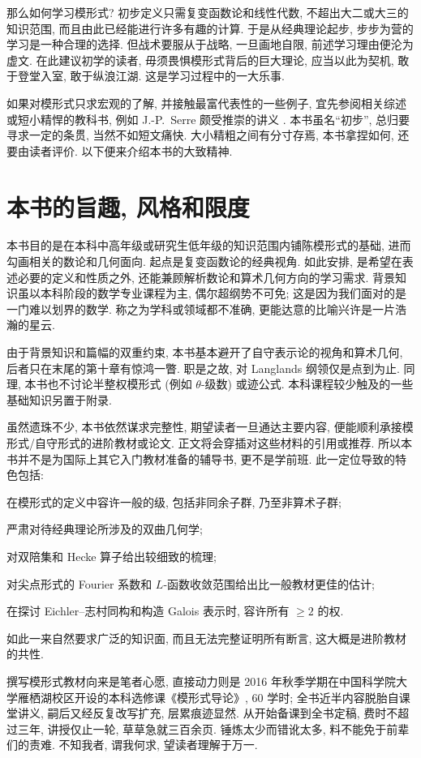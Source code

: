 那么如何学习模形式? 初步定义只需复变函数论和线性代数, 不超出大二或大三的知识范围, 而且由此已经能进行许多有趣的计算. 于是从经典理论起步, 步步为营的学习是一种合理的选择. 但战术要服从于战略, 一旦画地自限, 前述学习理由便沦为虚文. 在此建议初学的读者, 毋须畏惧模形式背后的巨大理论, 应当以此为契机, 敢于登堂入室, 敢于纵浪江湖. 这是学习过程中的一大乐事.

如果对模形式只求宏观的了解, 并接触最富代表性的一些例子, 宜先参阅相关综述或短小精悍的教科书, 例如 J.-P.\ Serre 颇受推崇的讲义 \cite{Se73}. 本书虽名``初步'', 总归要寻求一定的条贯, 当然不如短文痛快. 大小精粗之间有分寸存焉, 本书拿捏如何, 还要由读者评价. 以下便来介绍本书的大致精神.


\section*{本书的旨趣, 风格和限度}
本书目的是在本科中高年级或研究生低年级的知识范围内铺陈模形式的基础, 进而勾画相关的数论和几何面向. 起点是复变函数论的经典视角. 如此安排, 是希望在表述必要的定义和性质之外, 还能兼顾解析数论和算术几何方向的学习需求. 背景知识虽以本科阶段的数学专业课程为主, 偶尔超纲势不可免; 这是因为我们面对的是一门难以划界的数学. 称之为学科或领域都不准确, 更能达意的比喻兴许是一片浩瀚的星云.

由于背景知识和篇幅的双重约束, 本书基本避开了自守表示论的视角和算术几何, 后者只在末尾的第十章有惊鸿一瞥. 职是之故, 对 Langlands 纲领仅是点到为止. 同理, 本书也不讨论半整权模形式 (例如 $\theta$-级数) 或迹公式. 本科课程较少触及的一些基础知识另置于附录.

虽然遗珠不少, 本书依然谋求完整性, 期望读者一旦通达主要内容, 便能顺利承接模形式/自守形式的进阶教材或论文. 正文将会穿插对这些材料的引用或推荐. 所以本书并不是为国际上其它入门教材准备的辅导书, 更不是学前班. 此一定位导致的特色包括:
\begin{compactitem}
	\item 在模形式的定义中容许一般的级, 包括非同余子群, 乃至非算术子群;
	\item 严肃对待经典理论所涉及的双曲几何学;
	\item 对双陪集和 Hecke 算子给出较细致的梳理;
	\item 对尖点形式的 Fourier 系数和 $L$-函数收敛范围给出比一般教材更佳的估计;
	\item 在探讨 Eichler--志村同构和构造 Galois 表示时, 容许所有 $\geq 2$ 的权.
\end{compactitem}
如此一来自然要求广泛的知识面, 而且无法完整证明所有断言, 这大概是进阶教材的共性.

撰写模形式教材向来是笔者心愿, 直接动力则是 2016 年秋季学期在中国科学院大学雁栖湖校区开设的本科选修课《模形式导论》, 60 学时; 全书近半内容脱胎自课堂讲义, 嗣后又经反复改写扩充, 层累痕迹显然. 从开始备课到全书定稿, 费时不超过三年, 讲授仅止一轮, 草草急就三百余页. 锤炼太少而错讹太多, 料不能免于前辈们的责难. 不知我者, 谓我何求, 望读者理解于万一. 

